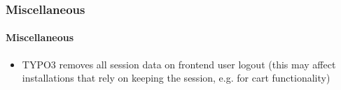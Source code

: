 %

\begin{frame}[fragile]
	\frametitle{Miscellaneous}
	\framesubtitle{Miscellaneous}

	\begin{itemize}
		\item TYPO3 removes all session data on frontend user logout\newline
			\small(this may affect installations that rely on keeping the session, e.g. for cart functionality)\normalsize

	\end{itemize}

\end{frame}


